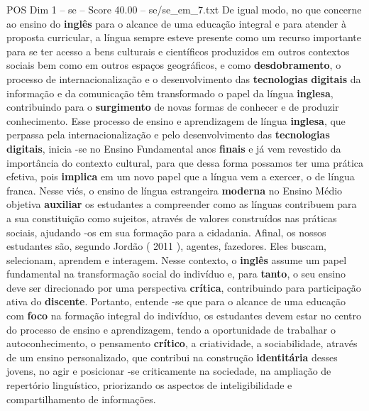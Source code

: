 \begin{textsample}{POS Dim 1 – se – Score 40.00 – se/se\_em\_7.txt}
De igual modo, no que concerne ao ensino do \textbf{inglês} para o alcance de uma educação integral e para atender à proposta curricular, a língua sempre esteve presente como um recurso importante para se ter acesso a bens culturais e científicos produzidos em outros contextos sociais bem como em outros espaços geográficos, e como \textbf{desdobramento}, o processo de internacionalização e o desenvolvimento das \textbf{tecnologias} \textbf{digitais} da informação e da comunicação têm transformado o papel da língua \textbf{inglesa}, contribuindo para o \textbf{surgimento} de novas formas de conhecer e de produzir conhecimento.
Esse processo de ensino e aprendizagem de língua \textbf{inglesa}, que perpassa pela internacionalização e pelo desenvolvimento das \textbf{tecnologias} \textbf{digitais}, inicia -se no Ensino Fundamental anos \textbf{finais} e já vem revestido da importância do contexto cultural, para que dessa forma possamos ter uma prática efetiva, pois \textbf{implica} em um novo papel que a língua vem a exercer, o de língua franca.
Nesse viés, o ensino de língua estrangeira \textbf{moderna} no Ensino Médio objetiva \textbf{auxiliar} os estudantes a compreender como as línguas contribuem para a sua constituição como sujeitos, através de valores construídos nas práticas sociais, ajudando -os em sua formação para a cidadania.
Afinal, os nossos estudantes são, segundo Jordão ( 2011 ), agentes, fazedores.
Eles buscam, selecionam, aprendem e interagem.
Nesse contexto, o \textbf{inglês} assume um papel fundamental na transformação social do indivíduo e, para \textbf{tanto}, o seu ensino deve ser direcionado por uma perspectiva \textbf{crítica}, contribuindo para participação ativa do \textbf{discente}.
Portanto, entende -se que para o alcance de uma educação com \textbf{foco} na formação integral do indivíduo, os estudantes devem estar no centro do processo de ensino e aprendizagem, tendo a oportunidade de trabalhar o autoconhecimento, o pensamento \textbf{crítico}, a criatividade, a sociabilidade, através de um ensino personalizado, que contribui na construção \textbf{identitária} desses jovens, no agir e posicionar -se criticamente na sociedade, na ampliação de repertório linguístico, priorizando os aspectos de inteligibilidade e compartilhamento de informações.

\end{textsample}
